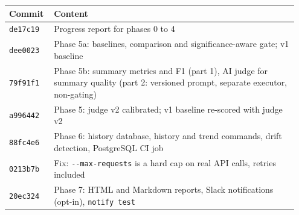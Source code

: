 \documentclass[11pt,a4paper]{article}
\newcommand{\code}[1]{\nolinkurl{#1}}
\begin{document}
\begin{longtable}{@{}p{0.14\linewidth}p{0.81\linewidth}@{}}
\toprule
\textbf{Commit} & \textbf{Content} \\
\midrule
\endhead
\code{de17c19} & Progress report for phases 0 to 4 \\
\code{dee0023} & Phase 5a: baselines, comparison and significance-aware gate; v1 baseline \\
\code{79f91f1} & Phase 5b: summary metrics and F1 (part 1), AI judge for summary quality (part 2: versioned prompt, separate executor, non-gating) \\
\code{a996442} & Phase 5: judge v2 calibrated; v1 baseline re-scored with judge v2 \\
\code{88fc4e6} & Phase 6: history database, history and trend commands, drift detection, PostgreSQL CI job \\
\code{0213b7b} & Fix: \texttt{-{}-max-requests} is a hard cap on real API calls, retries included \\
\code{20ec324} & Phase 7: HTML and Markdown reports, Slack notifications (opt-in), \texttt{notify test} \\
\bottomrule
\end{longtable}
\end{document}
